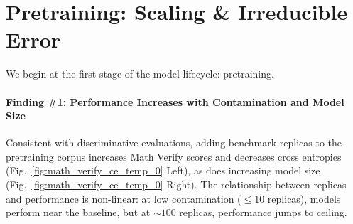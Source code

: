 \section{Pretraining: Scaling \& Irreducible Error}
\label{sec:pretraining}

We begin at the first stage of the model lifecycle: pretraining.

\paragraph{Finding \#1: Performance Increases with Contamination and Model Size}
Consistent with discriminative evaluations, adding benchmark replicas to the pretraining corpus increases Math Verify scores and decreases cross entropies (Fig.~\ref{fig:math_verify_ce_temp_0} Left), as does increasing model size (Fig.~\ref{fig:math_verify_ce_temp_0} Right). The relationship between replicas and performance is non-linear: at low contamination ($\leq 10$ replicas), models perform near the baseline, but at $\mathord{\sim}100$ replicas, performance jumps to ceiling.

